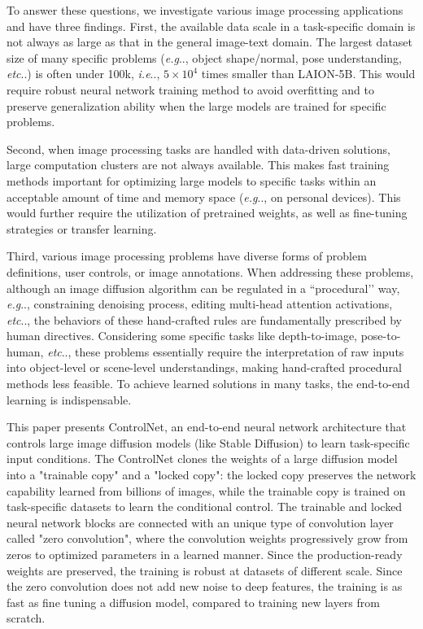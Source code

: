 \documentclass{article}
\makeatletter
\DeclareRobustCommand\onedot{\futurelet\@let@token\@onedot}
\def\@onedot{\ifx\@let@token.\else.\null\fi\xspace}
\def\eg{\emph{e.g}\onedot}
\def\ie{\emph{i.e}\onedot}
\def\etc{\emph{etc}\onedot}
\makeatother
\begin{document}
To answer these questions, we investigate various image processing applications and have three findings. First, the available data scale in a task-specific domain is not always as large as that in the general image-text domain. The largest dataset size of many specific problems (\eg, object shape/normal, pose understanding, \etc) is often under 100k, \ie, $5\times10^4$ times smaller than LAION-5B. This would require robust neural network training method to avoid overfitting and to preserve generalization ability when the large models are trained for specific problems.

Second, when image processing tasks are handled with data-driven solutions, large computation clusters are not always available. This makes fast training methods important for optimizing large models to specific tasks within an acceptable amount of time and memory space (\eg, on personal devices). This would further require the utilization of pretrained weights, as well as fine-tuning strategies or transfer learning.

Third, various image processing problems have diverse forms of problem definitions, user controls, or image annotations. When addressing these problems, although an image diffusion algorithm can be regulated in a ``procedural’’ way, \eg, constraining denoising process, editing multi-head attention activations, \etc, the behaviors of these hand-crafted rules are fundamentally prescribed by human directives. Considering some specific tasks like depth-to-image, pose-to-human, \etc, these problems essentially require the interpretation of raw inputs into object-level or scene-level understandings, making hand-crafted procedural methods less feasible. To achieve learned solutions in many tasks, the end-to-end learning is indispensable.

This paper presents ControlNet, an end-to-end neural network architecture that controls large image diffusion models (like Stable Diffusion) to learn task-specific input conditions. The ControlNet clones the weights of a large diffusion model into a "trainable copy" and a "locked copy": the locked copy preserves the network capability learned from billions of images, while the trainable copy is trained on task-specific datasets to learn the conditional control. The trainable and locked neural network blocks are connected with an unique type of convolution layer called "zero convolution", where the convolution weights progressively grow from zeros to optimized parameters in a learned manner. Since the production-ready weights are preserved, the training is robust at datasets of different scale. Since the zero convolution does not add new noise to deep features, the training is as fast as fine tuning a diffusion model, compared to training new layers from scratch.
\end{document}
